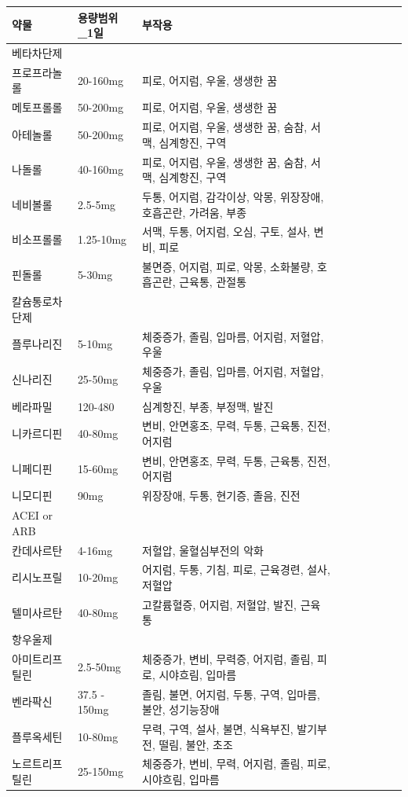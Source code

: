 \documentclass[]{book}
\begin{document}
\begin{longtable}{lllllllll}
\toprule
약물 & 용량범위\_1일 & 부작용\\
\midrule
베타차단제 &  & \\
프로프라놀롤 & 20-160mg & 피로, 어지럼, 우울, 생생한 꿈\\
메토프롤롤 & 50-200mg & 피로, 어지럼, 우울, 생생한 꿈\\
아테놀롤 & 50-200mg & 피로, 어지럼, 우울, 생생한 꿈, 숨참, 서맥, 심계항진, 구역\\
나돌롤 & 40-160mg & 피로, 어지럼, 우울, 생생한 꿈, 숨참, 서맥, 심계항진, 구역\\
\addlinespace
네비볼롤 & 2.5-5mg & 두통, 어지럼, 감각이상, 악몽, 위장장애, 호흡곤란, 가려움, 부종\\
비소프롤롤 & 1.25-10mg & 서맥, 두통, 어지럼, 오심, 구토, 설사, 변비, 피로\\
핀돌롤 & 5-30mg & 불면증, 어지럼, 피로, 악몽, 소화불량, 호흡곤란, 근육통, 관절통\\
칼슘통로차단제 &  & \\
플루나리진 & 5-10mg & 체중증가, 졸림, 입마름, 어지럼, 저혈압, 우울\\
\addlinespace
신나리진 & 25-50mg & 체중증가, 졸림, 입마름, 어지럼, 저혈압, 우울\\
베라파밀 & 120-480 & 심계항진, 부종, 부정맥, 발진\\
니카르디핀 & 40-80mg & 변비, 안면홍조, 무력, 두통, 근육통, 진전, 어지럼\\
니페디핀 & 15-60mg & 변비, 안면홍조, 무력, 두통, 근육통, 진전, 어지럼\\
니모디핀 & 90mg & 위장장애, 두통, 현기증, 졸음, 진전\\
\addlinespace
ACEI or ARB &  & \\
칸데사르탄 & 4-16mg & 저혈압, 울혈심부전의 악화\\
리시노프릴 & 10-20mg & 어지럼, 두통, 기침, 피로, 근육경련, 설사, 저혈압\\
텔미사르탄 & 40-80mg & 고칼륨혈증, 어지럼, 저혈압, 발진, 근육통\\
항우울제 &  & \\
\addlinespace
아미트리프틸린 & 2.5-50mg & 체중증가, 변비, 무력증, 어지럼, 졸림, 피로, 시야흐림, 입마름\\
벤라팍신 & 37.5 - 150mg & 졸림, 불면, 어지럼, 두통, 구역, 입마름, 불안, 성기능장애\\
플루옥세틴 & 10-80mg & 무력, 구역, 설사, 불면, 식욕부진, 발기부전, 떨림, 불안, 초조\\
노르트리프틸린 & 25-150mg & 체중증가, 변비, 무력, 어지럼, 졸림, 피로, 시야흐림, 입마름\\

\end{longtable}
\end{document}
